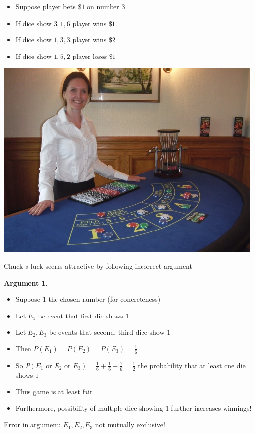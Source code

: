 \documentclass[handout]{beamer}
\theoremstyle{definition}
\newtheorem{argument}{Argument}
\begin{document}
\begin{frame}
\begin{example}
\begin{itemize}
\item Suppose player bets $\$1$ on number $3$
\item If dice show $3,1,6$ player wins $\$1$
\item If dice show $1,3,3$ player wins $\$2$
\item If dice show $1,5,2$ player loses $\$1$
\end{itemize}
\end{example}
\begin{center}\includegraphics[scale=.35]{Chuck2}\end{center}
\end{frame}

\begin{frame}
Chuck-a-luck seems attractive by following \alert{incorrect} argument
\begin{argument}
\begin{itemize}
\item Suppose $1$ the chosen number (for concreteness)
\item Let $E_1$ be event that first die shows $1$
\item Let $E_2,E_3$ be events that second, third dice show $1$
\item Then $P\left(E_1\right)=P\left(E_2\right)=P\left(E_3\right)
=\frac{1}{6}$
\item So $P\left(\text{$E_1$ or $E_2$ or $E_3$}\right)
=\frac{1}{6}+\frac{1}{6}+\frac{1}{6}=\frac{1}{2}$
the probability that at least one die shows $1$
\item Thus game is at least fair
\item Furthermore, possibility of \alert{multiple} dice
showing $1$ further increases winnings!
\end{itemize}
\end{argument}
Error in argument:
$E_1,E_2,E_3$ \alert{not mutually exclusive}!
\end{frame}
\end{document}
